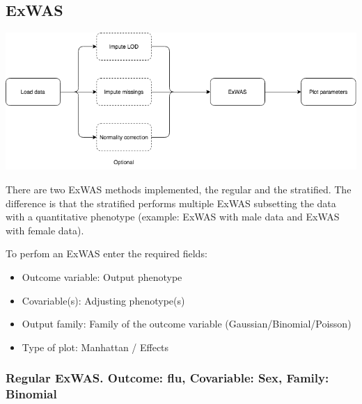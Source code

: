 \documentclass[
]{book}
\providecommand{\tightlist}{%
  \setlength{\itemsep}{0pt}\setlength{\parskip}{0pt}}
\begin{document}
\hypertarget{exwas}{%
\subsection{ExWAS}\label{exwas}}

\includegraphics{images/analysis7_1.png}

There are two ExWAS methods implemented, the regular and the stratified. The difference is that the stratified performs multiple ExWAS subsetting the data with a quantitative phenotype (example: ExWAS with male data and ExWAS with female data).

To perfom an ExWAS enter the required fields:

\begin{itemize}
\tightlist
\item
  Outcome variable: Output phenotype
\item
  Covariable(s): Adjusting phenotype(s)
\item
  Output family: Family of the outcome variable (Gaussian/Binomial/Poisson)
\item
  Type of plot: Manhattan / Effects
\end{itemize}

\hypertarget{regular-exwas.-outcome-flu-covariable-sex-family-binomial}{%
\subsubsection{Regular ExWAS. Outcome: flu, Covariable: Sex, Family: Binomial}\label{regular-exwas.-outcome-flu-covariable-sex-family-binomial}}
\end{document}

